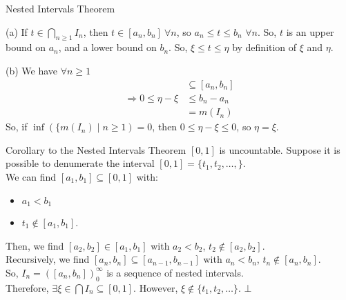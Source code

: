\documentclass[10pt]{extarticle}
\begin{document}
\begin{problem}{Nested Intervals Theorem}
\begin{problem}{(a)}
      If $t\in \bigcap_{n\geq 1}I_n$, then $t\in [a_n,b_n]~\forall n$, so $a_n \leq t \leq b_n$ $\forall n$. So, $t$ is an upper bound on $a_n$, and a lower bound on $b_n$. So, $\xi \leq t \leq \eta$ by definition of $\xi$ and $\eta$.
    \end{problem}
    \begin{problem}{(b)}
      We have $\forall n\geq 1$
      \begin{align*}
        [\xi,\eta] &\subseteq [a_n,b_n]\\
        \Rightarrow 0 \leq \eta-\xi &\leq b_n-a_n\\
                                    &= m(I_n)
      \end{align*}
      So, if $\inf\left(\{m(I_n)\mid n\geq 1\right) = 0$, then $0\leq \eta-\xi \leq 0$, so $\eta = \xi$.
    \end{problem}
  \end{problem}
  \begin{problem}{Corollary to the Nested Intervals Theorem}
    $[0,1]$ is uncountable.
    \tcblower
    Suppose it is possible to denumerate the interval $[0,1] = \{t_1,t_2,\dots,\}$.\\

    We can find $[a_1,b_1]\subseteq [0,1]$ with:
    \begin{itemize}
      \item $a_1 < b_1$
      \item $t_1\notin [a_1,b_1]$.
    \end{itemize}
    Then, we find $[a_2,b_2]\in [a_1,b_1]$ with $a_2 < b_2$, $t_2\notin [a_2,b_2]$.\\

    Recursively, we find $[a_n,b_n]\subseteq [a_{n-1},b_{n-1}]$ with $a_n < b_n$, $t_n\notin [a_n,b_n]$.\\

    So, $I_n = ([a_n,b_n])_{0}^{\infty}$ is a sequence of nested intervals.\\

    Therefore, $\exists \xi\in \bigcap I_n \subseteq [0,1]$. However, $\xi \notin \{t_1,t_2,\dots\}$. $\bot$
  \end{problem}
\end{document}
